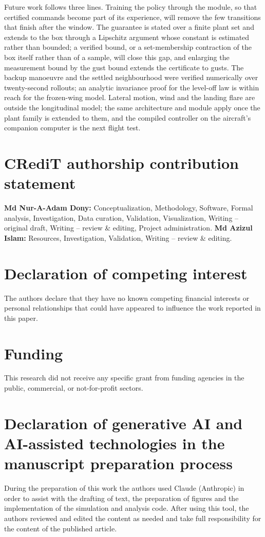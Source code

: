 \documentclass[final,5p,times,twocolumn]{elsarticle}
\begin{document}
Future work follows three lines. Training the policy through the module, so that certified commands become part of its experience, will remove the few transitions that finish after the window. The guarantee is stated over a finite plant set and extends to the box through a Lipschitz argument whose constant is estimated rather than bounded; a verified bound, or a set-membership contraction of the box itself rather than of a sample, will close this gap, and enlarging the measurement bound by the gust bound extends the certificate to gusts. The backup manoeuvre and the settled neighbourhood were verified numerically over twenty-second rollouts; an analytic invariance proof for the level-off law is within reach for the frozen-wing model. Lateral motion, wind and the landing flare are outside the longitudinal model; the same architecture and module apply once the plant family is extended to them, and the compiled controller on the aircraft's companion computer is the next flight test.



\section*{CRediT authorship contribution statement}
\textbf{Md Nur-A-Adam Dony:} Conceptualization, Methodology, Software, Formal analysis, Investigation, Data curation, Validation, Visualization, Writing -- original draft, Writing -- review \& editing, Project administration. \textbf{Md Azizul Islam:} Resources, Investigation, Validation, Writing -- review \& editing.
\section*{Declaration of competing interest}
The authors declare that they have no known competing financial interests or personal relationships that could have appeared to influence the work reported in this paper.
\section*{Funding}
This research did not receive any specific grant from funding agencies in the public, commercial, or not-for-profit sectors.
\section*{Declaration of generative AI and AI-assisted technologies in the manuscript preparation process}
During the preparation of this work the authors used Claude (Anthropic) in order to assist with the drafting of text, the preparation of figures and the implementation of the simulation and analysis code. After using this tool, the authors reviewed and edited the content as needed and take full responsibility for the content of the published article.
\end{document}
